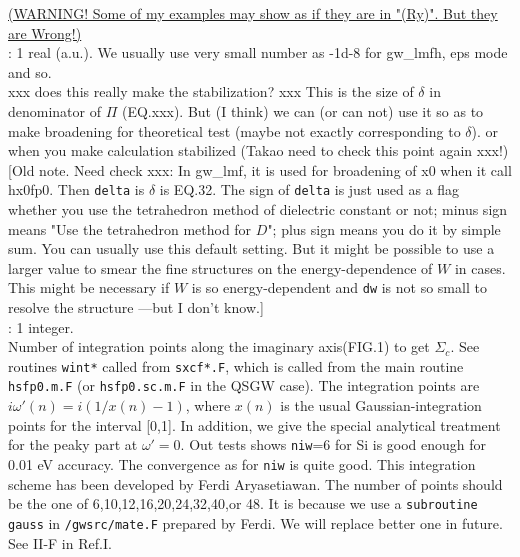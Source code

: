 \documentclass[a4paper,10pt,epsf,fleqn]{article}
\newcommand{\keyw}[1]{\fbox{\tt #1}}
\begin{document}
{\begin{enumerate}

\underline{(WARNING! Some of my examples may show as if they are in "(Ry)". But they are Wrong!)}\\


\vspace{2mm}
\keyw{delta}: 1 real (a.u.). We usually use very small number as -1d-8
for gw\_lmfh, eps mode and so.\\
xxx does this really make the stabilization? xxx
This is the size of $\delta$ in denominator of $\Pi$ (EQ.xxx).
But (I think) we can (or can not) use it so as to make broadening 
for theoretical test (maybe not exactly corresponding to $\delta$).
or when you make calculation stabilized 
(Takao need to check this point again xxx!) \\

[Old note. Need check xxx:
In gw\_lmf, it is used for broadening of x0 when it call hx0fp0.
Then {\tt delta} is $\delta$ is EQ.32.
The sign of {\tt delta} is just used as a flag whether you use the
tetrahedron method of dielectric constant \cite{rath75} or not; minus sign means
"Use the tetrahedron method for $D$"; plus sign means you do it by simple sum.
You can usually use this default setting. But it might be possible
to use a larger value to smear the fine structures
on the energy-dependence of $W$ in cases.
This might be necessary if $W$ is so energy-dependent 
and \verb#dw# is not so small to resolve the structure
---but I don't know.]\\


\keyw{niw} : 1 integer. \\
Number of integration points along the imaginary axis(FIG.1)
to get $\Sigma_c$.
See routines {\tt wint*} called from {\tt sxcf*.F},
which is called from the main routine {\tt hsfp0.m.F} (or {\tt hsfp0.sc.m.F} in the QSGW case).
The integration points are
$i \omega'(n)= i( 1/x(n) -1)$, where $x(n)$ is
the usual Gaussian-integration points for the interval [0,1].
In addition, we give the special analytical treatment for
the peaky part at $\omega'=0$.
Out tests shows {\tt niw}=6 for Si is good enough for 0.01 eV accuracy.
The convergence as for {\tt niw} is quite good.
This integration scheme has been developed by Ferdi Aryasetiawan.
The number of points should be the one of 6,10,12,16,20,24,32,40,or 48. 
It is because we use a {\tt subroutine gauss} in {\tt /gwsrc/mate.F} 
prepared by Ferdi. We will replace better one in future.
See II-F in Ref.I.\\


\end{enumerate}}
\end{document}
